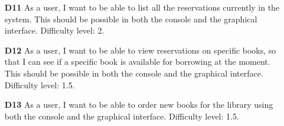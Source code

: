 \begin{itemize}
  \item [\textbf{D11}] As a user, I want to be able to list all the reservations currently in the system. This should be possible in both the console and the graphical interface. Difficulty level: 2.
  \item [\textbf{D12}] As a user, I want to be able to view reservations on specific books, so that I can see if a specific book is available for borrowing at the moment. This should be possible in both the console and the graphical interface. Difficulty level: 1.5.
  \item [\textbf{D13}] As a user, I want to be able to order new books for the library using both the console and the graphical interface. Difficulty level: 1.5.
\end{itemize}

